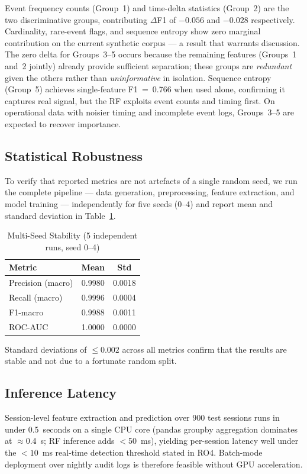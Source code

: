 Event frequency counts (Group~1) and time-delta statistics (Group~2) are the
two discriminative groups, contributing $\Delta$F1 of $-0.056$ and $-0.028$
respectively. Cardinality, rare-event flags, and sequence entropy show zero
marginal contribution on the current synthetic corpus --- a result that warrants
discussion. The zero delta for Groups~3--5 occurs because the remaining features
(Groups~1 and~2 jointly) already provide sufficient separation; these groups
are \emph{redundant} given the others rather than \emph{uninformative} in isolation.
Sequence entropy (Group~5) achieves single-feature F1~=~0.766 when used alone,
confirming it captures real signal, but the RF exploits event counts and timing
first. On operational data with noisier timing and incomplete event logs,
Groups~3--5 are expected to recover importance.

\subsection{Statistical Robustness}

To verify that reported metrics are not artefacts of a single random seed, we run the
complete pipeline --- data generation, preprocessing, feature extraction, and model
training --- independently for five seeds (0--4) and report mean and standard deviation
in Table~\ref{tab:multiseed}.

\begin{table}[!t]
  \caption{Multi-Seed Stability (5 independent runs, seed 0--4)}
  \label{tab:multiseed}
  \centering
  \begin{tabular}{lcc}
    \hline
    Metric & Mean & Std \\
    \hline
    Precision (macro) & 0.9980 & 0.0018 \\
    Recall (macro)    & 0.9996 & 0.0004 \\
    F1-macro          & 0.9988 & 0.0011 \\
    ROC-AUC           & 1.0000 & 0.0000 \\
    \hline
  \end{tabular}
\end{table}

Standard deviations of $\leq 0.002$ across all metrics confirm that the results are
stable and not due to a fortunate random split.

\subsection{Inference Latency}

Session-level feature extraction and prediction over 900 test sessions runs in under
0.5~seconds on a single CPU core (pandas groupby aggregation dominates at $\approx$0.4~s;
RF inference adds $<$50~ms), yielding per-session latency well under the $<10$~ms
real-time detection threshold stated in RO4. Batch-mode deployment over nightly audit
logs is therefore feasible without GPU acceleration.
